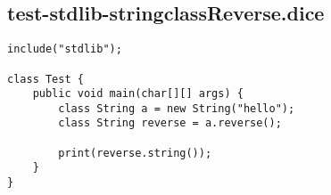 \subsection{test-stdlib-stringclassReverse.dice}
\begin{verbatim}
include("stdlib");

class Test {
    public void main(char[][] args) {
        class String a = new String("hello");
        class String reverse = a.reverse();

        print(reverse.string());
    }   
}

\end{verbatim}